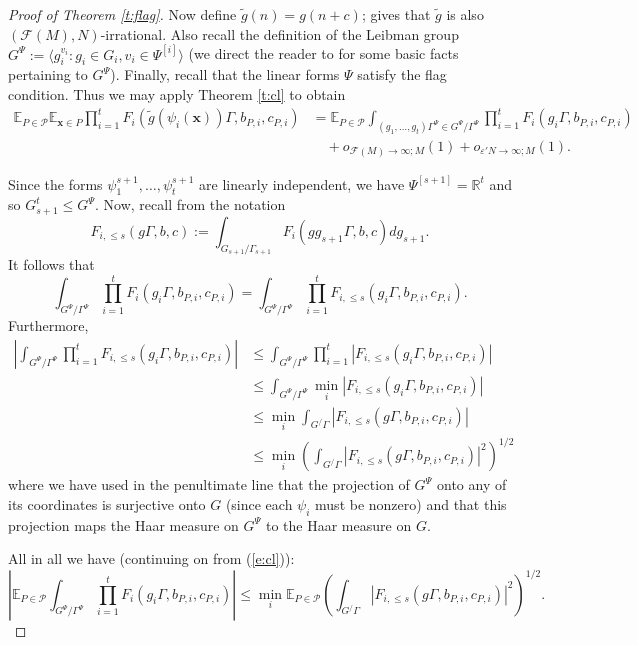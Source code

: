 \documentclass[10pt]{article}
\def\cF{\mathcal{F}}
\def\cP{\mathcal{P}}
\def\eps{\varepsilon}
\def\R{\mathbb{R}}
\def\E{\mathbb{E}}
\newcommand{\vect}[1]{\boldsymbol{#1}}
\begin{document}
\begin{proof}[Proof of Theorem \ref{t:flag}]
Now define $\tilde g(n) = g(n + c)$; \cite[Lemma A.8]{GT10} gives that $\tilde g$ is also $(\cF(M), N)$-irrational. Also recall the definition of the Leibman group $G^\Psi:= \langle g_i^{v_i}: g_i \in G_i, v_i \in \Psi^{[i]} \rangle$ (we direct the reader to \cite[Chapter 3]{GT10} for some basic facts pertaining to $G^\Psi$). Finally, recall that the linear forms $\Psi$ satisfy the flag condition. Thus we may apply Theorem \ref{t:cl} to obtain 
\begin{align}\label{e:cl}
\E_{P\in \cP}\E_{\vect x \in P} \prod_{i=1}^t  F_i(\tilde g(\psi_i(\vect x))\Gamma,b_{P,i},c_{P,i}) &= \E_{P\in \cP}\int_{(g_1,\ldots, g_t)\Gamma^\Psi \in G^{\Psi}/\Gamma^{\Psi}} \prod_{i=1}^t F_i(g_i\Gamma, b_{P,i}, c_{P,i})\\
&\quad + o_{\cF(M)\to \infty;M}(1) + o_{\eps'N \to \infty; M}(1).\nonumber
\end{align}



Since the forms $\psi_1^{s+1}, \ldots, \psi_t^{s+1}$ are linearly independent, we have $ \Psi^{[s+1]} = \R^t$ and so $G_{s+1}^t \leq G^{ \Psi}$. Now, recall from \cite[Chapter 7]{GT10} the notation \[F_{i,\leq s}(g\Gamma,b,c) := \int_{G_{s+1}/\Gamma_{s+1}} F_i(gg_{s+1}\Gamma,b,c)dg_{s+1}.\] It follows that 
\[\int_{G^{ \Psi}/\Gamma^{ \Psi}} \prod_{i=1}^t F_i(g_i\Gamma, b_{P,i}, c_{P,i}) = \int_{G^{ \Psi}/\Gamma^{ \Psi}} \prod_{i=1}^t F_{i,\leq s}(g_i\Gamma, b_{P,i}, c_{P,i}).\]
Furthermore, 
\begin{align*}
\left|\int_{G^{ \Psi}/\Gamma^{ \Psi}} \prod_{i=1}^t F_{i,\leq s}(g_i\Gamma, b_{P,i}, c_{P,i})\right| &\leq \int_{G^{ \Psi}/\Gamma^{ \Psi}} \prod_{i=1}^t \left|F_{i,\leq s}(g_i\Gamma, b_{P,i}, c_{P,i})\right| \\
&\leq \int_{G^{ \Psi}/\Gamma^{ \Psi}} \min_i|F_{i,\leq s}(g_i\Gamma, b_{P,i}, c_{P,i})| \\ &\leq \min_i \int_{G^/\Gamma} |F_{i,\leq s}(g\Gamma, b_{P,i}, c_{P,i})| \\
&\leq \min_i \left(\int_{G^/\Gamma} |F_{i,\leq s}(g\Gamma, b_{P,i}, c_{P,i})|^2\right)^{1/2}
\end{align*}
where we have used in the penultimate line that the projection of $G^{ \Psi}$ onto any of its coordinates is surjective onto $G$ (since each $\psi_i$ must be nonzero) and that this projection maps the Haar measure on $G^\Psi$ to the Haar measure on $G$. 

All in all we have (continuing on from (\ref{e:cl})):
\begin{equation}\label{e:projbd}
\left|\E_{P\in \cP}\int_{G^{ \Psi}/\Gamma^{ \Psi}} \prod_{i=1}^t F_i(g_i\Gamma, b_{P,i}, c_{P,i})\right| \leq \min_i \E_{P\in \cP} \left(\int_{G^/\Gamma} |F_{i,\leq s}(g\Gamma, b_{P,i}, c_{P,i})|^2\right)^{1/2}.
\end{equation}


\end{proof}
\end{document}
